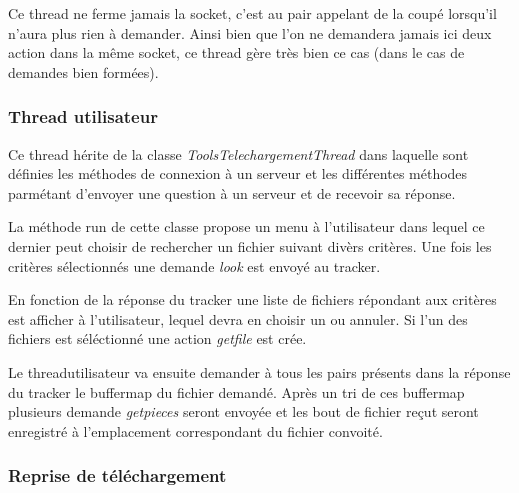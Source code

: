 Ce thread ne ferme jamais la socket, c'est au pair appelant de la
coupé lorsqu'il n'aura plus rien à demander. Ainsi bien que l'on ne
demandera jamais ici deux action dans la même socket, ce thread gère
très bien ce cas (dans le cas de demandes bien formées).


\subsubsection{Thread utilisateur}
Ce thread hérite de la classe \textit{ToolsTelechargementThread} dans
laquelle sont définies les méthodes de connexion à un serveur et les
différentes méthodes parmétant d'envoyer une question à un serveur et
de recevoir sa réponse.

La méthode run de cette classe propose un menu à l'utilisateur dans
lequel ce dernier peut choisir de rechercher un fichier suivant divèrs
critères. Une fois les critères sélectionnés une demande \textit{look}
est envoyé au tracker. 

En fonction de la réponse du tracker une liste de fichiers répondant
aux critères est afficher à l'utilisateur, lequel devra en choisir un
ou annuler. Si l'un des fichiers est séléctionné une action
\textit{getfile} est crée.


Le threadutilisateur va ensuite demander à tous les pairs présents
dans la réponse du tracker le buffermap du fichier demandé. Après un
tri de ces buffermap plusieurs demande \textit{getpieces} seront
envoyée et les bout de fichier reçut seront enregistré à l'emplacement
correspondant du fichier convoité.

\subsubsection{Reprise de téléchargement}

